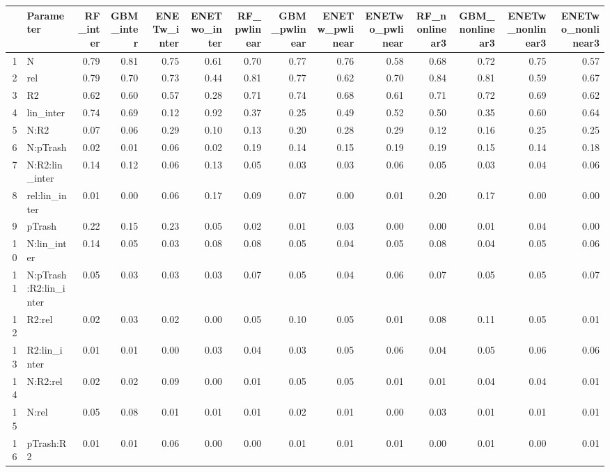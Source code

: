\begin{table}[ht]
\centering
\begin{tabular}{rlrrrrrrrrrrrr}
  \hline
 & Parameter & RF\_inter & GBM\_inter & ENETw\_inter & ENETwo\_inter & RF\_pwlinear & GBM\_pwlinear & ENETw\_pwlinear & ENETwo\_pwlinear & RF\_nonlinear3 & GBM\_nonlinear3 & ENETw\_nonlinear3 & ENETwo\_nonlinear3 \\ 
  \hline
1 & N & 0.79 & 0.81 & 0.75 & 0.61 & 0.70 & 0.77 & 0.76 & 0.58 & 0.68 & 0.72 & 0.75 & 0.57 \\ 
  2 & rel & 0.79 & 0.70 & 0.73 & 0.44 & 0.81 & 0.77 & 0.62 & 0.70 & 0.84 & 0.81 & 0.59 & 0.67 \\ 
  3 & R2 & 0.62 & 0.60 & 0.57 & 0.28 & 0.71 & 0.74 & 0.68 & 0.61 & 0.71 & 0.72 & 0.69 & 0.62 \\ 
  4 & lin\_inter & 0.74 & 0.69 & 0.12 & 0.92 & 0.37 & 0.25 & 0.49 & 0.52 & 0.50 & 0.35 & 0.60 & 0.64 \\ 
  5 & N:R2 & 0.07 & 0.06 & 0.29 & 0.10 & 0.13 & 0.20 & 0.28 & 0.29 & 0.12 & 0.16 & 0.25 & 0.25 \\ 
  6 & N:pTrash & 0.02 & 0.01 & 0.06 & 0.02 & 0.19 & 0.14 & 0.15 & 0.19 & 0.19 & 0.15 & 0.14 & 0.18 \\ 
  7 & N:R2:lin\_inter & 0.14 & 0.12 & 0.06 & 0.13 & 0.05 & 0.03 & 0.03 & 0.06 & 0.05 & 0.03 & 0.04 & 0.06 \\ 
  8 & rel:lin\_inter & 0.01 & 0.00 & 0.06 & 0.17 & 0.09 & 0.07 & 0.00 & 0.01 & 0.20 & 0.17 & 0.00 & 0.00 \\ 
  9 & pTrash & 0.22 & 0.15 & 0.23 & 0.05 & 0.02 & 0.01 & 0.03 & 0.00 & 0.00 & 0.01 & 0.04 & 0.00 \\ 
  10 & N:lin\_inter & 0.14 & 0.05 & 0.03 & 0.08 & 0.08 & 0.05 & 0.04 & 0.05 & 0.08 & 0.04 & 0.05 & 0.06 \\ 
  11 & N:pTrash:R2:lin\_inter & 0.05 & 0.03 & 0.03 & 0.03 & 0.07 & 0.05 & 0.04 & 0.06 & 0.07 & 0.05 & 0.05 & 0.07 \\ 
  12 & R2:rel & 0.02 & 0.03 & 0.02 & 0.00 & 0.05 & 0.10 & 0.05 & 0.01 & 0.08 & 0.11 & 0.05 & 0.01 \\ 
  13 & R2:lin\_inter & 0.01 & 0.01 & 0.00 & 0.03 & 0.04 & 0.03 & 0.05 & 0.06 & 0.04 & 0.05 & 0.06 & 0.06 \\ 
  14 & N:R2:rel & 0.02 & 0.02 & 0.09 & 0.00 & 0.01 & 0.05 & 0.05 & 0.01 & 0.01 & 0.04 & 0.04 & 0.01 \\ 
  15 & N:rel & 0.05 & 0.08 & 0.01 & 0.01 & 0.01 & 0.02 & 0.01 & 0.00 & 0.03 & 0.01 & 0.01 & 0.01 \\ 
  16 & pTrash:R2 & 0.01 & 0.01 & 0.06 & 0.00 & 0.00 & 0.01 & 0.01 & 0.01 & 0.00 & 0.01 & 0.00 & 0.01 \\ 
   \hline
\end{tabular}
\end{table}
